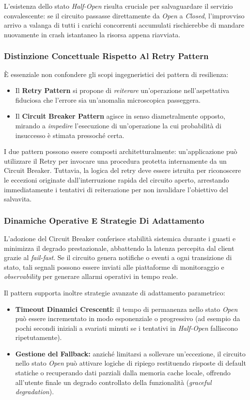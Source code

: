 \documentclass[11pt, a4paper]{article}
\begin{document}
L'esistenza dello stato \emph{Half-Open} risulta cruciale per salvaguardare il servizio convalescente: se il circuito passasse direttamente da \emph{Open} a \emph{Closed}, l'improvviso arrivo a valanga di tutti i carichi concorrenti accumulati rischierebbe di mandare nuovamente in crash istantaneo la risorsa appena riavviata.

\subsubsection{Distinzione Concettuale Rispetto Al Retry Pattern}

È essenziale non confondere gli scopi ingegneristici dei pattern di resilienza:
\begin{itemize}[noitemsep]
    \item Il \textbf{Retry Pattern} si propone di \emph{reiterare} un'operazione nell'aspettativa fiduciosa che l'errore sia un'anomalia microscopica passeggera.
    \item Il \textbf{Circuit Breaker Pattern} agisce in senso diametralmente opposto, mirando a \emph{impedire} l'esecuzione di un'operazione la cui probabilità di insuccesso è stimata pressoché certa.
\end{itemize}

I due pattern possono essere composti architetturalmente: un'applicazione può utilizzare il Retry per invocare una procedura protetta internamente da un Circuit Breaker. Tuttavia, la logica del retry deve essere istruita per riconoscere le eccezioni originate dall'interruzione rapida del circuito aperto, arrestando immediatamente i tentativi di reiterazione per non invalidare l'obiettivo del salvavita.

\subsubsection{Dinamiche Operative E Strategie Di Adattamento}

L'adozione del Circuit Breaker conferisce stabilità sistemica durante i guasti e minimizza il degrado prestazionale, abbattendo la latenza percepita dal client grazie al \emph{fail-fast}. Se il circuito genera notifiche o eventi a ogni transizione di stato, tali segnali possono essere inviati alle piattaforme di monitoraggio e \emph{observability} per generare allarmi operativi in tempo reale.

Il pattern supporta inoltre strategie avanzate di adattamento parametrico:
\begin{itemize}
    \item \textbf{Timeout Dinamici Crescenti:} il tempo di permanenza nello stato \emph{Open} può essere incrementato in modo esponenziale o progressivo (ad esempio da pochi secondi iniziali a svariati minuti se i tentativi in \emph{Half-Open} falliscono ripetutamente).
    \item \textbf{Gestione del Fallback:} anziché limitarsi a sollevare un'eccezione, il circuito nello stato \emph{Open} può attivare logiche di ripiego restituendo risposte di default statiche o recuperando dati parziali dalla memoria cache locale, offrendo all'utente finale un degrado controllato della funzionalità (\emph{graceful degradation}).
\end{itemize}
\end{document}
